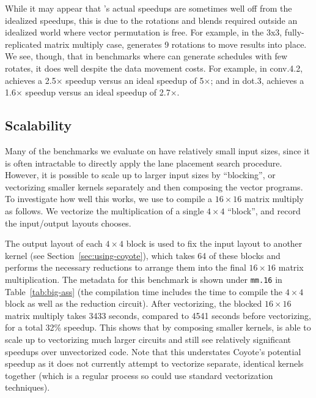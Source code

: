While it may appear that \system's actual speedups are sometimes well off from the idealized speedups, this is due to the rotations and blends required outside an idealized world where vector permutation is free. For example, in the \textsf{3x3}, fully-replicated matrix multiply case, \system generates 9 rotations to move results into place. We see, though, that in benchmarks where \system can generate schedules with few rotates, it does well despite the data movement costs. For example, in \textsf{conv.4.2}, \system achieves a 2.5$\times$ speedup versus an ideal speedup of 5$\times$; and in \textsf{dot.3}, \system achieves a 1.6$\times$ speedup versus an ideal speedup of 2.7$\times$.

\subsection{Scalability}\label{sec:scalability}
Many of the benchmarks we evaluate on have relatively small input sizes, since it is often intractable to directly apply the lane placement search procedure.
However, it is possible to scale \system up to larger input sizes by ``blocking'', or vectorizing smaller kernels separately and then composing the vector programs.
To investigate how well this works, we use \system to compile a $16\times 16$ matrix multiply as follows.
We vectorize the multiplication of a single $4\times 4$ ``block'', and record the input/output layouts \system chooses.

The output layout of each $4\times 4$ block is used to fix the input layout to another kernel (see Section~{\ref{sec:using-coyote}}), which takes 64 of these blocks and performs the necessary reductions to arrange them into the final $16\times 16$ matrix multiplication.
The metadata for this benchmark is shown under {{\tt mm.16}} in Table~{\ref{tab:big-ass}} (the compilation time includes the time to compile the $4\times 4$ block as well as the reduction circuit).
After vectorizing, the blocked $16\times 16$ matrix multiply takes 3433 seconds, compared to 4541 seconds before vectorizing, for a total 32\% speedup.
This shows that by composing smaller kernels, {\system} is able to scale up to vectorizing much larger circuits and still see relatively significant speedups over unvectorized code. Note that this understates Coyote's potential speedup as it does not currently attempt to vectorize separate, identical kernels together (which is a regular process so could use standard vectorization techniques).

